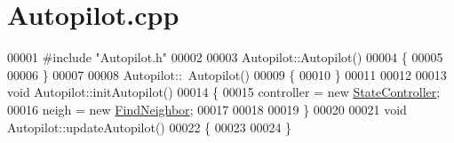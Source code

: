 \hypertarget{_autopilot_8cpp_source}{}\section{Autopilot.\+cpp}
\label{_autopilot_8cpp_source}

\begin{DoxyCode}
00001 \textcolor{preprocessor}{#include "Autopilot.h"}
00002 
00003 Autopilot::Autopilot()
00004 \{
00005 
00006 \}
00007 
00008 Autopilot::~Autopilot()
00009 \{
00010 \}
00011 
00012 
00013 \textcolor{keywordtype}{void} Autopilot::initAutopilot()
00014 \{
00015     controller = \textcolor{keyword}{new} \hyperlink{class_state_controller}{StateController};
00016     neigh = \textcolor{keyword}{new} \hyperlink{class_find_neighbor}{FindNeighbor};
00017 
00018     
00019 \}
00020 
00021 \textcolor{keywordtype}{void} Autopilot::updateAutopilot()
00022 \{
00023     
00024 \}
\end{DoxyCode}
